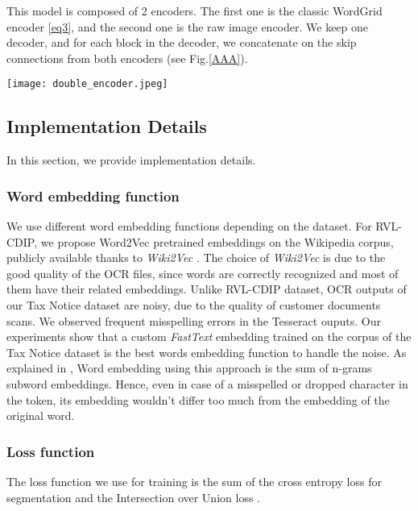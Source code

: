 \documentclass[conference]{IEEEtran}
\begin{document}
This model is composed of 2 encoders. The first one is the classic WordGrid encoder \eqref{eq3}, and the second one is the raw image encoder. We keep one decoder, and for each block in the decoder, we concatenate on the skip connections from both encoders (see Fig.\ref{AAA}).
\begin{figure*}
 \center
  \texttt{[image: double\_encoder.jpeg]}
  \caption{VisualWordGrid-2encoders pipeline.}
  \label{AAA}
\end{figure*}

\subsection{Implementation Details}

In this section, we provide implementation details.

\subsubsection{Word embedding function}\hfill

We use different word embedding functions depending on the dataset. For RVL-CDIP, we propose Word2Vec pretrained embeddings on the Wikipedia corpus, publicly available thanks to \textit{Wiki2Vec} \cite{wiki2vec}. The choice of \textit{Wiki2Vec} is due to the good quality of the OCR files, since words are correctly recognized and most of them have their related embeddings. Unlike RVL-CDIP dataset, OCR outputs of our Tax Notice dataset are noisy, due to the quality of customer documents scans. We observed frequent misspelling errors in the Tesseract \cite{tesseract} ouputs. Our experiments show that a custom \textit{ FastText} embedding trained on the corpus of the Tax Notice dataset is the best words embedding function to handle the noise. As explained in \cite{fasttext}, Word embedding using this approach is the sum of n-grams subword embeddings. Hence, even in case of a misspelled or  dropped character in the token, its embedding wouldn't differ too much from the embedding of the original word.

\subsubsection{Loss function}\hfill

The loss function we use for training is the sum of the cross entropy loss for segmentation  and the Intersection over Union loss .
\end{document}
